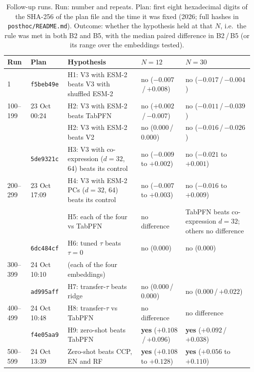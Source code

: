 \documentclass[10pt,letterpaper]{article}
\begin{document}
\begin{table}[H]
\centering
\caption{Follow-up runs. Run: number and repeats. Plan: first eight hexadecimal digits of the SHA-256 of the plan file and the time it
was fixed (2026; full hashes in \texttt{posthoc/README.md}). Outcome: whether the hypothesis held at that $N$,
i.e.\ the rule was met in both B2 and B5, with the median paired difference in B2\,/\,B5 (or its range over
the embeddings tested).}
\label{tab:posthoc}
\begin{tabularx}{\textwidth}{@{}l l >{\raggedright\arraybackslash}X >{\raggedright\arraybackslash}p{1.32in} >{\raggedright\arraybackslash}p{1.32in}@{}}
\toprule
Run & Plan & Hypothesis & $N = 12$ & $N = 30$ \\
\midrule
1 & \texttt{f5beb49e} & H1: V3 with ESM-2 beats V3 with shuffled ESM-2 & no ($-0.007$\,/\,$+0.008$) & no ($-0.017$\,/\,$-0.004$) \\
100--199 & 23 Oct 00:24 & H2: V3 with ESM-2 beats TabPFN & no ($+0.002$\,/\,$-0.007$) & no ($-0.011$\,/\,$-0.039$) \\
 & & H2: V3 with ESM-2 beats V2 & no ($0.000$\,/\,$0.000$) & no ($-0.016$\,/\,$-0.026$) \\
\addlinespace
2 & \texttt{5de9321c} & H3: V3 with co-expression ($d = 32$, 64) beats its control & no ($-0.009$ to $+0.002$) & no ($-0.021$ to $+0.001$) \\
200--299 & 23 Oct 17:09 & H4: V3 with ESM-2 PCs ($d = 32$, 64) beats its control & no ($-0.007$ to $+0.003$) & no ($-0.016$ to $+0.009$) \\
 & & H5: each of the four vs TabPFN & no difference & TabPFN beats co-expression $d = 32$; others no difference \\
\addlinespace
3 & \texttt{6dc484cf} & H6: tuned $\tau$ beats $\tau = 0$ & no ($0.000$) & no ($0.000$) \\
300--399 & 24 Oct 10:10 & \quad (each of the four embeddings) & & \\
\addlinespace
4 & \texttt{ad995aff} & H7: transfer-$\tau$ beats ridge & no ($0.000$\,/\,$0.000$) & no ($0.000$\,/\,$+0.022$) \\
400--499 & 24 Oct 10:48 & H8: transfer-$\tau$ vs TabPFN & no difference & no difference \\
\addlinespace
5 & \texttt{f4e05aa9} & H9: zero-shot beats TabPFN & \textbf{yes} ($+0.108$\,/\,$+0.096$) & \textbf{yes} ($+0.092$\,/\,$+0.038$) \\
500--599 & 24 Oct 13:39 & Zero-shot beats CCP, EN and RF & \textbf{yes} ($+0.108$ to $+0.128$) & \textbf{yes} ($+0.056$ to $+0.110$) \\
\bottomrule
\end{tabularx}
\end{table}
\end{document}
